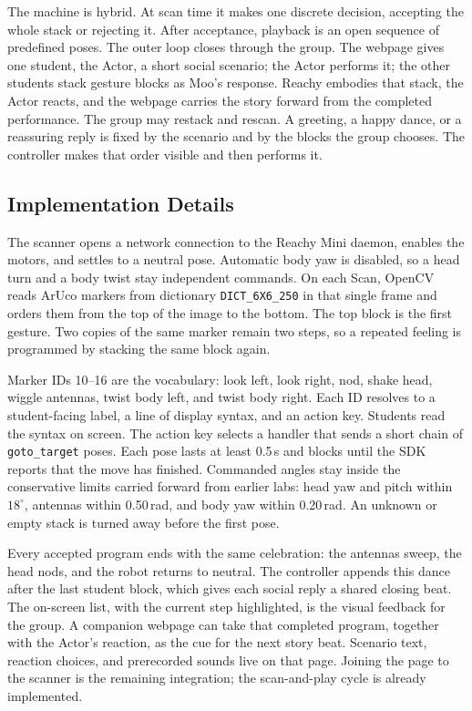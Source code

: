 \documentclass[conference,12pt,letterpaper]{IEEEtran}
\begin{document}
The machine is hybrid. At scan time it makes one discrete decision, accepting the whole stack or rejecting it. After acceptance, playback is an open sequence of predefined poses. The outer loop closes through the group. The webpage gives one student, the Actor, a short social scenario; the Actor performs it; the other students stack gesture blocks as Moo's response. Reachy embodies that stack, the Actor reacts, and the webpage carries the story forward from the completed performance. The group may restack and rescan. A greeting, a happy dance, or a reassuring reply is fixed by the scenario and by the blocks the group chooses. The controller makes that order visible and then performs it.

\subsection{Implementation Details}
The scanner opens a network connection to the Reachy Mini daemon, enables the motors, and settles to a neutral pose. Automatic body yaw is disabled, so a head turn and a body twist stay independent commands. On each Scan, OpenCV reads ArUco markers from dictionary \texttt{DICT\_6X6\_250} in that single frame and orders them from the top of the image to the bottom. The top block is the first gesture. Two copies of the same marker remain two steps, so a repeated feeling is programmed by stacking the same block again.

Marker IDs 10--16 are the vocabulary: look left, look right, nod, shake head, wiggle antennas, twist body left, and twist body right. Each ID resolves to a student-facing label, a line of display syntax, and an action key. Students read the syntax on screen. The action key selects a handler that sends a short chain of \texttt{goto\_target} poses. Each pose lasts at least 0.5\,s and blocks until the SDK reports that the move has finished. Commanded angles stay inside the conservative limits carried forward from earlier labs: head yaw and pitch within $18^{\circ}$, antennas within 0.50\,rad, and body yaw within 0.20\,rad. An unknown or empty stack is turned away before the first pose.

Every accepted program ends with the same celebration: the antennas sweep, the head nods, and the robot returns to neutral. The controller appends this dance after the last student block, which gives each social reply a shared closing beat. The on-screen list, with the current step highlighted, is the visual feedback for the group. A companion webpage can take that completed program, together with the Actor's reaction, as the cue for the next story beat. Scenario text, reaction choices, and prerecorded sounds live on that page. Joining the page to the scanner is the remaining integration; the scan-and-play cycle is already implemented.
\end{document}
